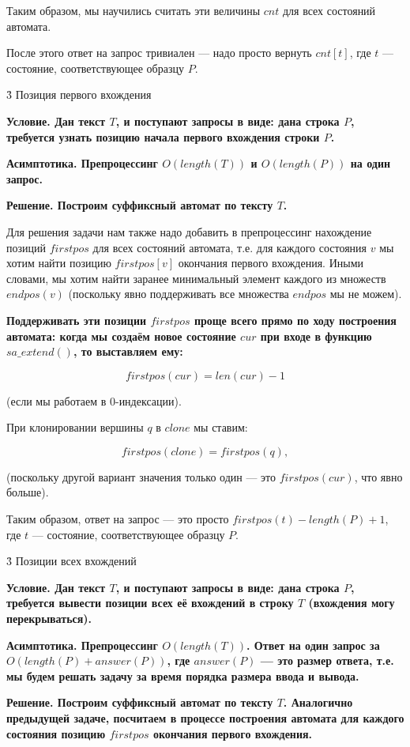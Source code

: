Таким образом, мы научились считать эти величины $cnt$ для всех состояний автомата.

После этого ответ на запрос тривиален --- надо просто вернуть $cnt[t]$, где $t$ --- состояние, соответствующее образцу $P$.


\h3{ Позиция первого вхождения }

\bf{Условие}. Дан текст $T$, и поступают запросы в виде: дана строка $P$, требуется узнать позицию начала первого вхождения строки $P$.

\bf{Асимптотика}. Препроцессинг $O (length (T))$ и $O (length (P))$ на один запрос.

\bf{Решение}. Построим суффиксный автомат по тексту $T$.

Для решения задачи нам также надо добавить в препроцессинг нахождение позиций $firstpos$ для всех состояний автомата, т.е. для каждого состояния $v$ мы хотим найти позицию $firstpos[v]$ окончания первого вхождения. Иными словами, мы хотим найти заранее минимальный элемент каждого из множеств $endpos(v)$ (поскольку явно поддерживать все множества $endpos$ мы не можем).

\bf{Поддерживать} эти позиции $firstpos$ проще всего прямо по ходу построения автомата: когда мы создаём новое состояние $cur$ при входе в функцию $sa\_extend()$, то выставляем ему:

$$ firstpos(cur) = len(cur) - 1 $$

(если мы работаем в $0$-индексации).

При клонировании вершины $q$ в $clone$ мы ставим:

$$ firstpos(clone) = firstpos(q), $$

(поскольку другой вариант значения только один --- это $firstpos(cur)$, что явно больше).

Таким образом, ответ на запрос --- это просто $firstpos(t)-length(P)+1$, где $t$ --- состояние, соответствующее образцу $P$.


\h3{ Позиции всех вхождений }

\bf{Условие}. Дан текст $T$, и поступают запросы в виде: дана строка $P$, требуется вывести позиции всех её вхождений в строку $T$ (вхождения могу перекрываться).

\bf{Асимптотика}. Препроцессинг $O (length (T))$. Ответ на один запрос за $O (length (P) + answer (P))$, где $answer(P)$ --- это размер ответа, т.е. мы будем решать задачу за время порядка размера ввода и вывода.

\bf{Решение}. Построим суффиксный автомат по тексту $T$. Аналогично предыдущей задаче, посчитаем в процессе построения автомата для каждого состояния позицию $firstpos$ окончания первого вхождения.


